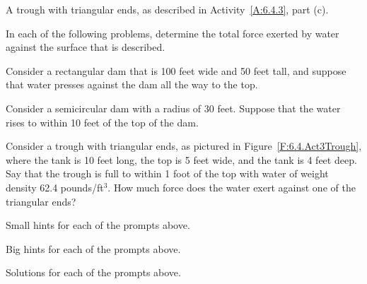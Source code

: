 \begin{marginfigure}[8cm]
\caption{A trough with triangular ends, as described in Activity~\ref{A:6.4.3}, part (c).} \label{F:6.4.Act3Trough}
\end{marginfigure}

\begin{activity} \label{A:6.5.3}  In each of the following problems, determine the total force exerted by water against the surface that is described.

\ba
	\item Consider a rectangular dam that is 100 feet wide and 50 feet tall, and suppose that water presses against the dam all the way to the top.  
	\item Consider a semicircular dam with a radius of 30 feet.  Suppose that the water rises to within 10 feet of the top of the dam.
	\item Consider a trough with triangular ends, as pictured in Figure~\ref{F:6.4.Act3Trough}, where the tank is 10 feet long, the top is 5 feet wide, and the tank is 4 feet deep.  Say that the trough is full to within 1 foot of the top with water of weight density 62.4 pounds/ft$^3$.  How much force does the water exert against one of the triangular ends?
\ea

\end{activity}
\begin{smallhint}
\ba
	\item Small hints for each of the prompts above.
\ea
\end{smallhint}
\begin{bighint}
\ba
	\item Big hints for each of the prompts above.
\ea
\end{bighint}
\begin{activitySolution}
\ba
	\item Solutions for each of the prompts above.
\ea
\end{activitySolution}
\aftera